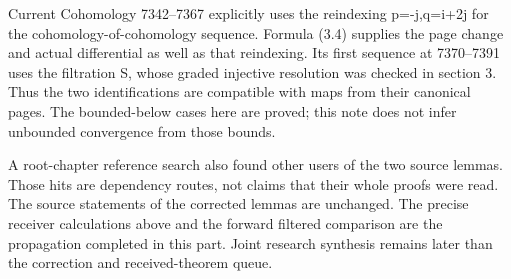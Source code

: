 Current Cohomology 7342–\allowbreak{}7367 explicitly uses the reindexing p\allowbreak{}=-j,\allowbreak{}q\allowbreak{}=i\allowbreak{}+2j for the cohomology-of-cohomology sequence. Formula (3.4)\allowbreak{} supplies the page change and actual differential as well as that reindexing. Its first sequence at 7370–\allowbreak{}7391 uses the filtration S,\allowbreak{} whose graded injective resolution was checked in section 3. Thus the two identifications are compatible with maps from their canonical pages. The bounded-below cases here are proved; this note does not infer unbounded convergence from those bounds.

A root-chapter reference search also found other users of the two source lemmas. Those hits are dependency routes,\allowbreak{} not claims that their whole proofs were read. The source statements of the corrected lemmas are unchanged. The precise receiver calculations above and the forward filtered comparison are the propagation completed in this part. Joint research synthesis remains later than the correction and received-theorem queue.
